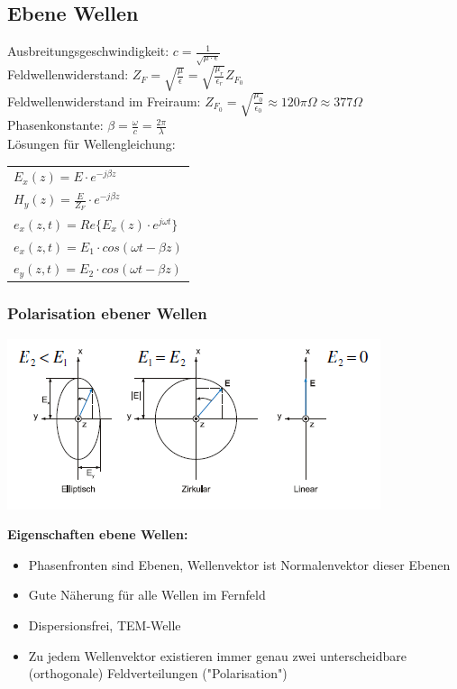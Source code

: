 \documentclass[english]{latex4ei/latex4ei_sheet}
\begin{document}
\begin{sectionbox}
\subsection{Ebene Wellen}
Ausbreitungsgeschwindigkeit: $c = \frac{1}{\sqrt{\mu \cdot \epsilon}}$\\
Feldwellenwiderstand: $Z_F = \sqrt{\frac{\mu}{\epsilon}} = \sqrt{\frac{\mu_r}{\epsilon_r}}Z_{F_0}$\\
Feldwellenwiderstand im Freiraum: $Z_{F_0} = \sqrt{\frac{\mu_0}{\epsilon_0}} \approx 120\pi\Omega \approx 377\Omega$\\
Phasenkonstante: $\beta = \frac{\omega}{c} = \frac{2\pi}{\lambda}$\\

Lösungen für Wellengleichung:

\begin{tabular*}{\columnwidth}{l}
	$E_x(z) = E\cdot e^{-j\beta z}$ \\
	$H_y(z) = \frac{E}{Z_F} \cdot e^{-j\beta z}$\\
	$e_x(z,t) = Re\{ E_x(z) \cdot e^{j\omega t} \}$\\
	$e_x(z,t) = E_1 \cdot cos(\omega t - \beta z)$\\
	$e_y(z,t) = E_2 \cdot cos(\omega t - \beta z)$\\
\end{tabular*}

\subsubsection{Polarisation ebener Wellen}

\begin{center}\includegraphics[width = 0.8\columnwidth]{./img/polarisation_ebener_wellen.png} \end{center}
\textbf{Eigenschaften ebene Wellen:}
\begin{itemize}
	\item Phasenfronten sind Ebenen, Wellenvektor ist Normalenvektor dieser Ebenen
	\item Gute Näherung für alle Wellen im Fernfeld
	\item Dispersionsfrei, TEM-Welle
	\item Zu jedem Wellenvektor existieren immer genau zwei unterscheidbare (orthogonale) Feldverteilungen ("Polarisation")
\end{itemize}


\end{sectionbox}
\end{document}
